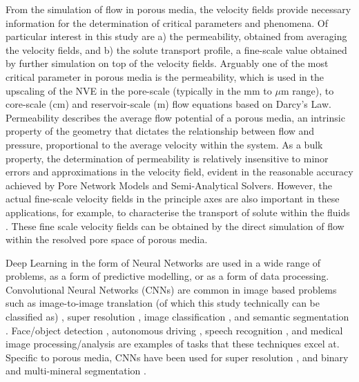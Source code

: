 \documentclass{article}
\begin{document}
From the simulation of flow in porous media, the velocity fields provide necessary information for the determination of critical parameters and phenomena. Of particular interest in this study are a) the permeability, obtained from averaging the velocity fields, and b) the solute transport profile, a fine-scale value obtained by further simulation on top of the velocity fields. Arguably one of the most critical parameter in porous media is the permeability, which is used in the upscaling of the NVE in the pore-scale (typically in the mm to $\mu$m range), to core-scale (cm) and reservoir-scale (m) flow equations based on Darcy's Law. Permeability describes the average flow potential of a porous media, an intrinsic property of the geometry that dictates the relationship between flow and pressure, proportional to the average velocity within the system. As a bulk property, the determination of permeability is relatively insensitive to minor errors and approximations in the velocity field, evident in the reasonable accuracy achieved by Pore Network Models and Semi-Analytical Solvers. However, the actual fine-scale velocity fields in the principle axes are also important in these applications, for example, to characterise the transport of solute within the fluids \cite{Mostaghimi2016,LIU2018130,LIU201712,LIU2017121}. These fine scale velocity fields can be obtained by the direct simulation of flow within the resolved pore space of porous media.

Deep Learning in the form of Neural Networks are used in a wide range of problems, as a form of predictive modelling, or as a form of data processing. Convolutional Neural Networks (CNNs) \cite{SCHMIDHUBER201585} are common in image based problems such as image-to-image translation (of which this study technically can be classified as) \cite{pix2pix2016,cyclegan}, super resolution \cite{EDSR,SRGANledig}, image classification \cite{resnet}, and semantic segmentation \cite{maskrcnn,ronneberger2015unet}. Face/object detection \cite{facedetection}, autonomous driving \cite{segnet}, speech recognition \cite{speech}, and medical image processing/analysis \cite{ldct1,ldct2,ldct3,umeharaSRCNNmedical,ctmedicalresolution1,circleGAN,segITO,segMed3DLI202075} are examples of tasks that these techniques excel at. Specific to porous media, CNNs have been used for super resolution \cite{wang2019super,wangedsrgan,DRSRD1,DeepRock-SR,peymanTSR}, and binary and multi-mineral segmentation \cite{computers8040072,KARIMPOULI2019142,uresnetseg}.
\end{document}
